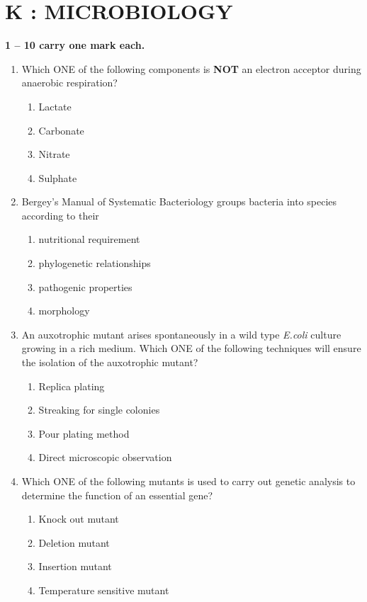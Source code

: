 \documentclass[journal,12pt,onecolumn]{IEEEtran}
\begin{document}
\section*{\centering K : MICROBIOLOGY}
\noindent \textbf{ 1 --  10 carry one mark each.}
\begin{enumerate}[label=\arabic*.]
\item Which ONE of the following components is \textbf{NOT} an electron acceptor during anaerobic respiration?
\begin{multicols}{4}
\begin{enumerate}[label=(\Alph*)]
\item Lactate
\item Carbonate
\item Nitrate
\item Sulphate
\end{enumerate}
\end{multicols}

\item Bergey’s Manual of Systematic Bacteriology groups bacteria into species according to their
\begin{multicols}{2}
\begin{enumerate}[label=(\Alph*)]
\item nutritional requirement
\item phylogenetic relationships
\item pathogenic properties
\item morphology
\end{enumerate}
\end{multicols}

\item An auxotrophic mutant arises spontaneously in a wild type \textit{E.coli} culture growing in a rich medium. Which ONE of the following techniques will ensure the isolation of the auxotrophic mutant?
\begin{multicols}{2}
\begin{enumerate}[label=(\Alph*)]
\item Replica plating
\item Streaking for single colonies
\item Pour plating method
\item Direct microscopic observation
\end{enumerate}
\end{multicols}

\item Which ONE of the following mutants is used to carry out genetic analysis to determine the function of an essential gene?
\begin{multicols}{2}
\begin{enumerate}[label=(\Alph*)]
\item Knock out mutant
\item Deletion mutant
\item Insertion mutant
\item Temperature sensitive mutant
\end{enumerate}
\end{multicols}


\end{enumerate}
\end{document}
